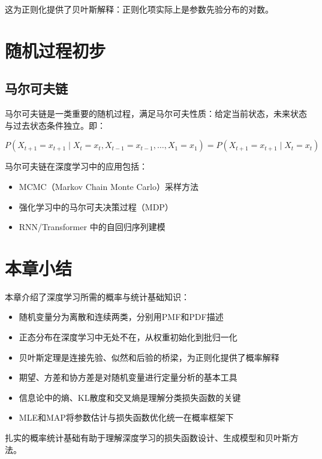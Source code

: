这为正则化提供了贝叶斯解释：正则化项实际上是参数先验分布的对数。

\section{随机过程初步}

\subsection{马尔可夫链}

马尔可夫链是一类重要的随机过程，满足马尔可夫性质：给定当前状态，未来状态与过去状态条件独立。即：

\[
P(X_{t+1}=x_{t+1}\mid X_t=x_t, X_{t-1}=x_{t-1},\ldots,X_1=x_1) = P(X_{t+1}=x_{t+1}\mid X_t=x_t)
\]

马尔可夫链在深度学习中的应用包括：
\begin{itemize}
    \item MCMC（Markov Chain Monte Carlo）采样方法
    \item 强化学习中的马尔可夫决策过程（MDP）
    \item RNN/Transformer 中的自回归序列建模
\end{itemize}

\section{本章小结}

本章介绍了深度学习所需的概率与统计基础知识：
\begin{itemize}
    \item 随机变量分为离散和连续两类，分别用PMF和PDF描述
    \item 正态分布在深度学习中无处不在，从权重初始化到批归一化
    \item 贝叶斯定理是连接先验、似然和后验的桥梁，为正则化提供了概率解释
    \item 期望、方差和协方差是对随机变量进行定量分析的基本工具
    \item 信息论中的熵、KL散度和交叉熵是理解分类损失函数的关键
    \item MLE和MAP将参数估计与损失函数优化统一在概率框架下
\end{itemize}

扎实的概率统计基础有助于理解深度学习的损失函数设计、生成模型和贝叶斯方法。
